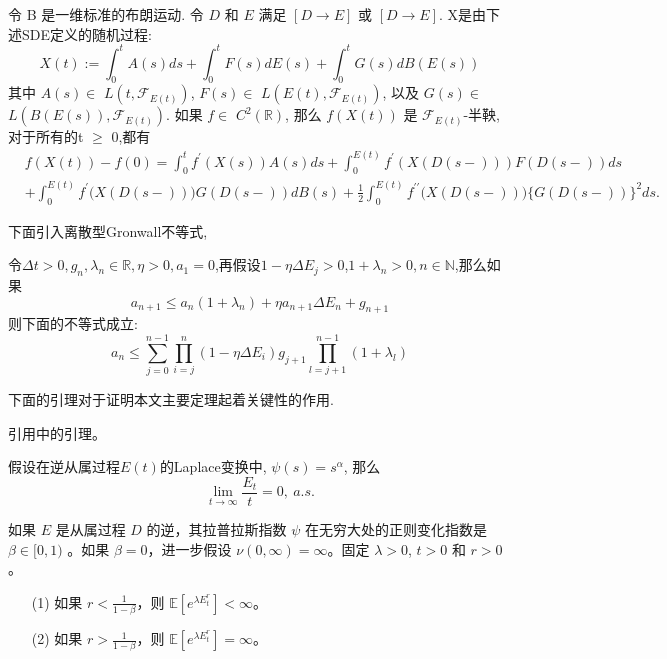 \begin{lemma}[It\^{o}公式]\label{ito}
	令 B 是一维标准的布朗运动. 令 $D$ 和 $E$ 满足 $[  D\longrightarrow E ]$ 或 $[  D\longrightarrow E ] .$ X是由下述SDE定义的随机过程:
	$$X(t):=\int_0^tA(s)ds+\int_0^tF(s)dE(s)+\int_0^tG(s)dB(E(s))$$
	其中 $A(s)\in$ $L( t, \mathcal{F} _{E(t)})$, $F(s)\in$ $L( E(t), \mathcal{F} _{E(t)})$, 以及 $G(s)\in$ $L( B(E(s)), \mathcal{F} _{E(t)}) .$ 如果 $f\in$ $C^2( \mathbb{R} )$, 那么
	$f(X(t))$ 是 $\mathcal{F}_{E(t)}$-半鞅, 对于所有的t $\ge$ 0,都有
	$$\begin{aligned}
		&f(X(t))-f(0)=\int_{0}^{t}f^{\prime}(X(s))A(s)ds+\int_{0}^{E(t)}f^{\prime}\left(X(D(s-))\right)F(D(s-))ds\\
		&+\int_{0}^{E(t)}f^{\prime}\big(X(D(s-))\big)G(D(s-))dB(s)+\frac{1}{2}\int_{0}^{E(t)}f^{\prime\prime}\big(X(D(s-))\big)\big\{G(D(s-))\big\}^{2}ds.
	\end{aligned}$$
\end{lemma}

下面引入离散型Gronwall不等式, 
\begin{lemma}\label{gronwall}
	令$\Delta t > 0,g_n,\lambda _n \in \mathbb{R},\eta > 0,a_1=0$,再假设$1-\eta \Delta E_j > 0$,$1 + \lambda _n > 0,n \in \mathbb{N}$,那么如果
	\begin{equation*}
		a_{n+1} \leq a_n(1+\lambda _n)+\eta a_{n+1}\Delta E_n +g_{n+1}
	\end{equation*}
	则下面的不等式成立:
	\begin{equation}
		a_n \leq \sum\limits_{j=0}^{n-1}\prod_{i=j}^{n}(1-\eta\Delta E_i)g_{j+1}\prod\limits_{l=j+1}^{n-1}(1+\lambda _l)
	\end{equation}
\end{lemma}

下面的引理对于证明本文主要定理起着关键性的作用.

引用\cite{nane2016stability}中的引理。

\begin{lemma}\label{slowerthant}
	假设在逆从属过程$E(t)$的Laplace变换中, $\psi(s)=s^{\alpha}$, 那么
	\begin{equation}
	\lim_{t\to\infty}\frac{E_t}{t}=0,\:a.s.
	\end{equation}
\end{lemma}


\begin{lemma}
	
		如果 $E$ 是从属过程 $D$ 的逆，其拉普拉斯指数 $\psi$ 在无穷大处的正则变化指数是 $\beta \in [0, 1)$ 。如果 $\beta = 0$，进一步假设 $\nu(0, \infty) = \infty$。固定 $\lambda > 0$, $t > 0$ 和 $r > 0$。
		\begin{enumerate}
			\item[(1)] 如果 $r < \frac{1}{1 - \beta}$，则 $\mathbb{E}\left[ e^{\lambda E_t^r} \right] < \infty$。
			\item[(2)] 如果 $r > \frac{1}{1 - \beta}$，则 $\mathbb{E}\left[ e^{\lambda E_t^r} \right] = \infty$。
		\end{enumerate}
	
	
\end{lemma}



